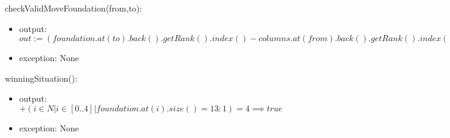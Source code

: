 \documentclass[12pt]{article}
\begin{document}
\noindent checkValidMoveFoundation(from,to):
\begin{itemize}
	\item output: $out := (foundation.at(to).back().getRank().index() - columns.at(from).back().getRank().index() = 1) \land (columns.at(from).back().getSuit() = foundation.at(to).back().getSuit()) \implies true$
	\item exception: None
\end{itemize}

\noindent winningSituation():
\begin{itemize}
	\item output: $+(i\in\mathit{N}|i\in[0..4]|foundation.at(i).size() = 13 : 1) = 4 \implies true$
	\item exception: None
\end{itemize}
\end{document}
